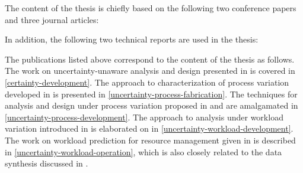 The content of the thesis is chiefly based on the following two conference
papers and three journal articles:

\printbibliography[heading=none,keyword=own]

In addition, the following two technical reports are used in the thesis:

\printbibliography[heading=none,keyword=own-unpublished]

The publications listed above correspond to the content of the thesis as
follows. The work on uncertainty-unaware analysis and design presented in
\cite{ukhov2012} is covered in \cref{certainty-development}. The approach to
characterization of process variation developed in \cite{ukhov2014a} is
presented in \cref{uncertainty-process-fabrication}. The techniques for analysis
and design under process variation proposed in \cite{ukhov2014b} and
\cite{ukhov2015} are amalgamated in \cref{uncertainty-process-development}. The
approach to analysis under workload variation introduced in \cite{ukhov2017a} is
elaborated on in \cref{uncertainty-workload-development}. The work on workload
prediction for resource management given in \cite{ukhov2017b} is described in
\cref{uncertainty-workload-operation}, which is also closely related to the data
synthesis discussed in \cite{ukhov2017c}.
